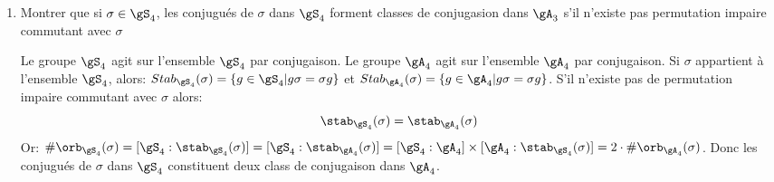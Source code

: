 \begin{exercise}
\begin{enumerate}
		\item Montrer que si $\sigma\in\gS_4$, les conjugués de $\sigma$ dans $\gS_4$ forment  classes de conjugasion dans $\gA_3$ s'il n'existe pas permutation impaire commutant avec $\sigma$

		\begin{remark}
			Le groupe $\gS_4$ agit sur l'ensemble $\gS_4$ par conjugaison.
			Le groupe $\gA_4$ agit sur l'ensemble $\gA_4$ par conjugaison.
			Si $\sigma$ appartient à l'ensemble $\gS_4$, alors: $Stab_{\gS_4}(\sigma)=\{g\in\gS_4 | g\sigma=\sigma g\}$ et $Stab_{\gA_4}(\sigma)=\{g\in\gA_4 | g\sigma=\sigma g\}$. S'il n'existe pas de permutation impaire commutant avec $\sigma$ alors:
			$$\stab_{\gS_4}(\sigma)=\stab_{\gA_4}(\sigma)$$
			Or: $\#\orb_{\gS_4}(\sigma)=[\gS_4: \stab_{\gS_4}(\sigma)]=[\gS_4: \stab_{\gA_4}(\sigma)]=[\gS_4:\gA_4]\times[\gA_4: \stab_{\gS_4}(\sigma)]=2\cdot \#\orb_{\gA_4}(\sigma)$. Donc les conjugués de $\sigma$ dans $\gS_4$ constituent deux class de conjugaison dans $\gA_4$.
		\end{remark}

	\end{enumerate}
\end{exercise}


